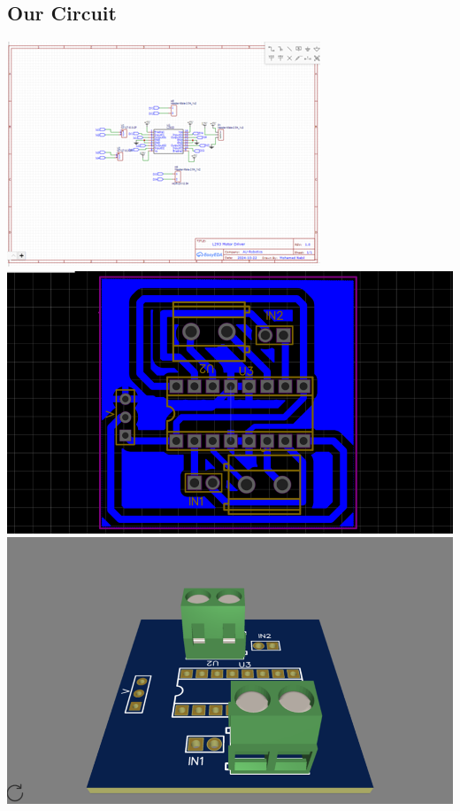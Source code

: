 \documentclass[a4paper,12pt]{article}
\begin{document}
\subsection{Our Circuit}
\includegraphics{media/circ1.png}
\includegraphics[trim=60 0 60 0, clip]{media/circ2.png}
\includegraphics{media/circ3.png}
\end{document}
